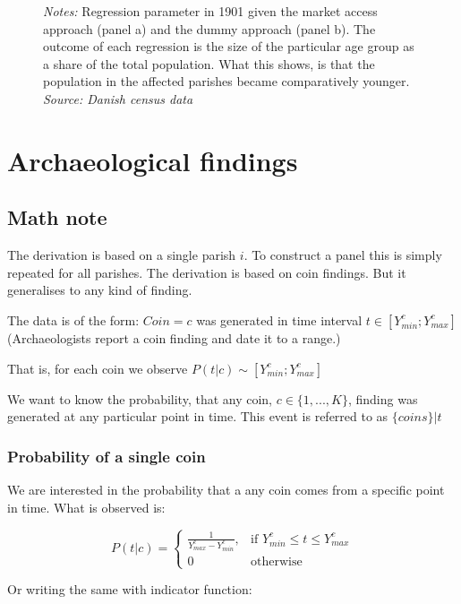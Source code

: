 \begin{figure}
\begin{subfigure}[b]{0.45\textwidth}
    \end{subfigure}
    \parbox{0.9\textwidth}{
    \caption*{\footnotesize \textit{Notes:} Regression parameter in 1901 given the market access approach (panel a) and the dummy approach (panel b). The outcome of each regression is the size of the particular age group as a share of the total population. What this shows, is that the population in the affected parishes became comparatively younger.  \\ \textit{Source: Danish census data}}
}
    \label{fig:age_group}
\end{figure}

\FloatBarrier
\section{Archaeological findings}

\subsection{Math note} 
The derivation is based on a single parish $i$. To construct a panel this is simply repeated for all parishes. The derivation is based on coin findings. But it generalises to any kind of finding.    

The data is of the form: $Coin=c$ was generated in time interval $t\in [Y_{min}^c;Y_{max}^c]$ (Archaeologists report a coin finding and date it to a range.)

That is, for each coin we observe $P(t|c)\sim [Y_{min}^c;Y_{max}^c]$ 

We want to know the probability, that any coin, $c\in \{1, ..., K\}$, finding was generated at any particular point in time. This event is referred to as $\{coins\}|t$

\subsubsection{Probability of a single coin} 
We are interested in the probability that a any coin comes from a specific point in time. What is observed is:

\begin{equation}
P(t|c)=\begin{cases}
\frac{1}{Y_{max}^c - Y_{min}^c}, & \text{if }Y_{min}^c\leq t \leq Y_{max}^c \\
0 & \text{otherwise}
\end{cases}
\end{equation}

Or writing the same with indicator function:

